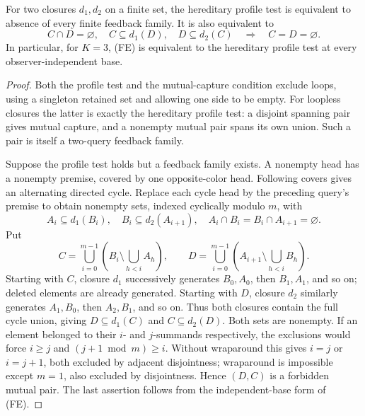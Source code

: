 \begin{theorem}
\label{core:thm:two-color-feedback}
For two closures $d_1,d_2$ on a finite set, the hereditary profile
test is equivalent to absence of every finite feedback family. It is
also equivalent to
\begin{equation}\label{core:eq:conditional-mutual-capture}
 C\cap D=\varnothing,\quad C\subseteq d_1(D),\quad
 D\subseteq d_2(C)\quad\Longrightarrow\quad C=D=\varnothing.
\end{equation}
In particular, for $K=3$, (FE) is equivalent to the hereditary profile
test at every observer-independent base.
\end{theorem}
\begin{proof}
Both the profile test and the mutual-capture condition exclude loops,
using a singleton retained set and allowing one side to be empty.
For loopless closures the latter is exactly the hereditary profile
test: a disjoint spanning pair gives mutual capture, and a nonempty
mutual pair spans its own union. Such a pair is itself a two-query
feedback family.

Suppose the profile test holds but a feedback family exists.
A nonempty head has a nonempty premise, covered by one opposite-color
head. Following covers gives an alternating directed cycle. Replace
each cycle head by the preceding query's premise to obtain nonempty
sets, indexed cyclically modulo $m$, with
\[
 A_i\subseteq d_1(B_i),\quad B_i\subseteq d_2(A_{i+1}),\quad
 A_i\cap B_i=B_i\cap A_{i+1}=\varnothing.
\]
Put
\[
 C=\bigcup_{i=0}^{m-1}\left(B_i\setminus\bigcup_{h<i}A_h\right),
 \qquad
 D=\bigcup_{i=0}^{m-1}\left(A_{i+1}\setminus\bigcup_{h<i}B_h\right).
\]
Starting with $C$, closure $d_1$ successively generates $B_0,A_0$,
then $B_1,A_1$, and so on; deleted elements are already generated.
Starting with $D$, closure $d_2$ similarly generates $A_1,B_0$,
then $A_2,B_1$, and so on. Thus both closures contain the full cycle
union, giving $D\subseteq d_1(C)$ and $C\subseteq d_2(D)$.
Both sets are nonempty.
If an element belonged to their $i$- and $j$-summands respectively,
the exclusions would force $i\geq j$ and $(j+1\bmod m)\geq i$.
Without wraparound this gives $i=j$ or $i=j+1$, both excluded by
adjacent disjointness; wraparound is impossible except $m=1$, also
excluded by disjointness. Hence $(D,C)$ is a forbidden mutual pair.
The last assertion follows from the independent-base form of (FE).
\end{proof}

